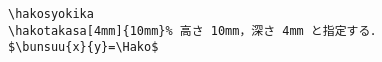 \begin{verbatim}
\hakosyokika
\hakotakasa[4mm]{10mm}%	高さ 10mm，深さ 4mm と指定する．
$\bunsuu{x}{y}=\Hako$
\end{verbatim}
